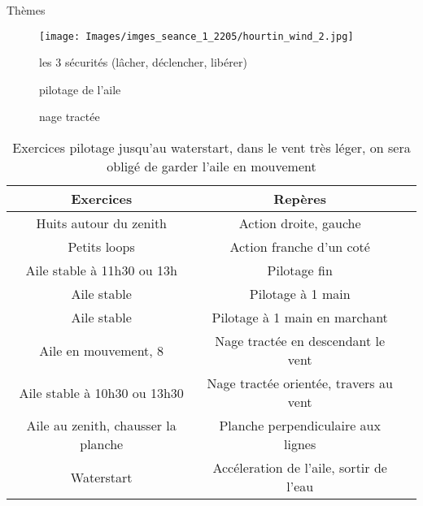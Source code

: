 \documentclass[10pt,a4paper]{beamer}
\begin{document}
\begin{frame}{Thèmes}
\begin{figure}
\texttt{[image: Images/imges\_seance\_1\_2205/hourtin\_wind\_2.jpg]} 
\end{figure}
\begin{figure}
\item les 3 sécurités (l\^acher, déclencher, libérer)
\item pilotage de l'aile
\item nage tractée 
\end{figure}
\end{frame}



\begin{frame}
\small{
\begin{table}
\begin{tabular}{|c|c|c|}
\hline
\textbf{Exercices}     &  \textbf{Repères}      \\
\hline 
Huits autour du zenith & Action droite, gauche   \\
\hline
Petits loops  & Action franche d'un coté  \\
\hline 
Aile stable à 11h30 ou 13h & Pilotage fin \\
\hline
Aile stable               & Pilotage à 1 main \\
\hline 
Aile stable               & Pilotage à 1 main en marchant \\
\hline
Aile en mouvement, 8      & Nage tractée en descendant le vent \\
\hline 
Aile stable à 10h30 ou 13h30   	& Nage tractée orientée, travers au vent \\
\hline
Aile au zenith, chausser la planche  & Planche perpendiculaire aux lignes \\
\hline
Waterstart                           &  Accéleration de l'aile, sortir de l'eau \\
\hline
\end{tabular}
\caption{Exercices pilotage jusqu'au waterstart, dans le vent très léger, on sera obligé de garder l'aile en mouvement}
\end{table}}
\end{frame}

\end{document}
